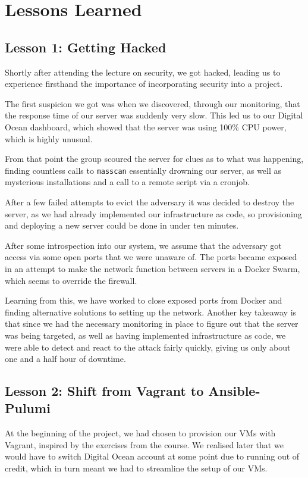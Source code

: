 \section{Lessons Learned}

\subsection{Lesson 1: Getting Hacked}
\label{section_hacked}
Shortly after attending the lecture on security, we got hacked, leading us to experience firsthand the importance of incorporating security into a project.

The first suspicion we got was when we discovered, through our monitoring, that the response time of our server was suddenly very slow. This led us to our Digital Ocean dashboard, which showed that the server was using 100\% CPU power, which is highly unusual.

From that point the group scoured the server for clues as to what was happening, finding countless calls to \texttt{masscan} essentially drowning our server, as well as mysterious installations and a call to a remote script via a cronjob.

After a few failed attempts to evict the adversary it was decided to destroy the server, as we had already implemented our infrastructure as code, so provisioning and deploying a new server could be done in under ten minutes.

After some introspection into our system, we assume that the adversary got access via some open ports that we were unaware of. The ports became exposed in an attempt to make the network function between servers in a Docker Swarm, which seems to override the firewall.

Learning from this, we have worked to close exposed ports from Docker and finding alternative solutions to setting up the network. Another key takeaway is that since we had the necessary monitoring in place to figure out that the server was being targeted, as well as having implemented infrastructure as code, we were able to detect and react to the attack fairly quickly, giving us only about one and a half hour of downtime.

\subsection{Lesson 2: Shift from Vagrant to Ansible-Pulumi}
At the beginning of the project, we had chosen to provision our VMs with Vagrant, inspired by the exercises from the course.
We realised later that we would have to switch Digital Ocean account at some point due to running out of credit, which in turn meant we had to streamline the setup of our VMs.

